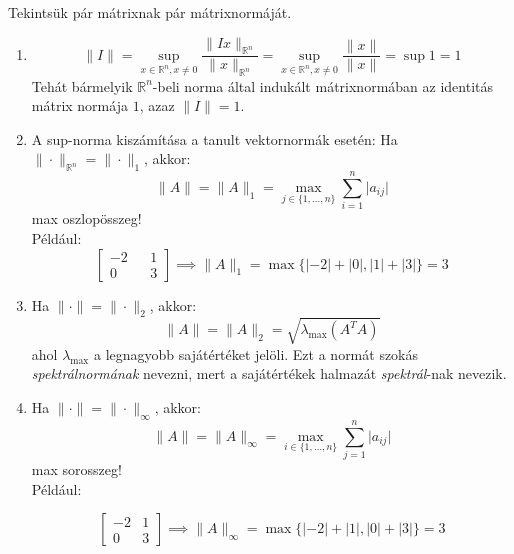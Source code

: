 \begin{pelda}
    Tekintsük pár mátrixnak pár mátrixnormáját.
\end{pelda}
\begin{enumerate}
    \item \begin{equation*}
        \| I \| = \sup_{x \in \mathbb{R}^{n}, x \neq 0} \frac{\| Ix \| _{\mathbb{R}^{n}}}{\| x \| _{\mathbb{R}^{n}}} = \sup_{x \in \mathbb{R}^{n}, x \neq 0} \frac{\| x \| }{\| x \| } = \sup 1 = 1
    \end{equation*}
    Tehát bármelyik $\mathbb{R}^{n}$-beli norma által indukált mátrixnormában az identitás mátrix normája $1$, azaz $\| I \| = 1$.

    \item A sup-norma kiszámítása a tanult vektornormák esetén:
        Ha $\| \cdot \|_{\mathbb{R}^{n}} = \| \cdot \|_{1}$, akkor:
        \begin{equation*}
            \| A \|  = \| A \| _{1} = \max_{j \in \{ 1, \dots, n \}} \sum_{i = 1} ^{n} \lvert a_{ij} \rvert 
        \end{equation*}
        max oszlopösszeg! \\
        Például:
        \begin{equation*}
            \begin{bmatrix}
            -2 && 1 \\
            0 && 3
            \end{bmatrix}
            \implies \| A \|_{1} =  \max \{ \lvert -2 \rvert + \lvert 0 \rvert, \lvert 1 \rvert + \lvert 3 \rvert  \} = 3
        \end{equation*}

    \item Ha $\| \cdot \| = \| \cdot \|_{2}$, akkor:
    \begin{equation*}
        \| A \| = \| A \|_{2} = \sqrt{ \lambda_{\max} (A^{T}A) }
    \end{equation*}
    ahol $\lambda_{\max}$ a legnagyobb sajátértéket jelöli.
    Ezt a normát szokás \textit{spektrálnormának} nevezni, mert a sajátértékek halmazát \textit{spektrál}-nak nevezik.

    \item Ha $\| \cdot \| = \| \cdot \|_{\infty}$, akkor:
    \begin{equation*}
        \| A \| = \| A \|_{\infty} = \max_{i \in \{ 1, \dots, n \}} \sum_{j=1}^{n} \lvert a_{ij} \rvert 
    \end{equation*}
    max sorosszeg!\\
    Például:

    \begin{equation*}
        \begin{bmatrix}
        -2 & 1 \\
        0 & 3
        \end{bmatrix}
        \implies \| A \| _{\infty} = \max \{ \lvert -2 \rvert + \lvert 1 \rvert , \lvert 0 \rvert + \lvert 3 \rvert  \} = 3
    \end{equation*}
\end{enumerate}

